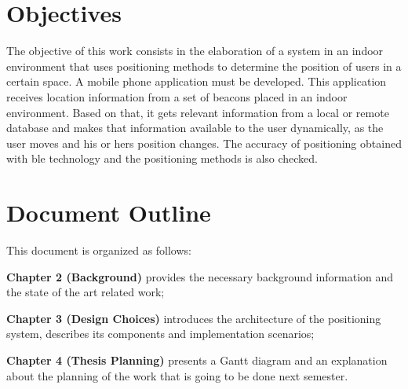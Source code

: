



\section{Objectives}
\label{section:objectives}

The objective of this work consists in the elaboration of a system in an indoor environment that uses positioning methods to determine the position of users in a certain space.
A mobile phone application must be developed. This application receives location information from a set of beacons placed in an indoor environment. Based on that, it gets relevant information from a local or remote database and makes that information available to the user dynamically, as the user moves and his or hers position changes.
The accuracy of positioning obtained with \gls{ble} technology and the positioning methods is also checked.


\section{Document Outline}
\label{section:outline}

This document is organized as follows:

\textbf{Chapter 2 (Background)}
provides the necessary background information and the state of the art related work;

\textbf{Chapter 3 (Design Choices)}
introduces the architecture of the positioning system, describes its components and implementation scenarios;

\textbf{Chapter 4 (Thesis Planning)}
presents a Gantt diagram and an explanation about the planning of the work that is going to be done next semester.
